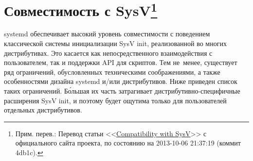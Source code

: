 \documentclass[10pt,oneside,a4paper]{article}
\newcommand{\sfnote}[1]{\texorpdfstring{\protect\footnote%
	{Прим. перев.: #1}}{}}
\begin{document}
\section{Совместимость с SysV\sfnote{Перевод статьи
<<\href{http://www.freedesktop.org/wiki/Software/systemd/Incompatibilities}%
{Compatibility with SysV}>> с официального сайта проекта, по
состоянию на 2013-10-06 21:37:19 (коммит 4db1c).}}

systemd обеспечивает высокий уровень совместимости с поведением классической
системы инициализации SysV init, реализованной во многих дистрибутивах.  Это
касается как непосредственного взаимодействия с пользователем, так и поддержки
API для скриптов. Тем не~менее, существует ряд ограничений, обусловленных
техническими соображениями, а также особенностями дизайна systemd и/или
дистрибутивов. Ниже приведен список таких ограничений. Б\'{о}льшая их часть
затрагивает дистрибутивно-специфичные расширения SysV init, и поэтому будет
ощутима только для пользователей отдельных дистрибутивов.
\end{document}
